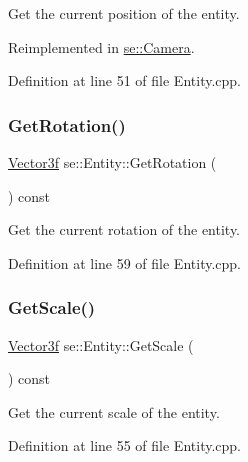 Get the current position of the entity. 

Reimplemented in \mbox{\hyperlink{classse_1_1_camera_af3d7f8a74dc26a3840331ab40b6ac893}{se\+::\+Camera}}.



Definition at line 51 of file Entity.\+cpp.

\mbox{\label{classse_1_1_entity_af509daf6cdb9bd75f2c503863c9a258c}} 
\subsubsection{\texorpdfstring{Get\+Rotation()}{GetRotation()}}
{\footnotesize\ttfamily \mbox{\hyperlink{namespacese_a12e07512d95e2fdebdaf74a5ea2cf5f6}{Vector3f}} se\+::\+Entity\+::\+Get\+Rotation (\begin{DoxyParamCaption}{ }\end{DoxyParamCaption}) const\hspace{0.3cm}{\ttfamily [virtual]}}

Get the current rotation of the entity. 

Definition at line 59 of file Entity.\+cpp.

\mbox{\label{classse_1_1_entity_abf885a240dc78562a82191fad6c9fc9b}} 
\subsubsection{\texorpdfstring{Get\+Scale()}{GetScale()}}
{\footnotesize\ttfamily \mbox{\hyperlink{namespacese_a12e07512d95e2fdebdaf74a5ea2cf5f6}{Vector3f}} se\+::\+Entity\+::\+Get\+Scale (\begin{DoxyParamCaption}{ }\end{DoxyParamCaption}) const\hspace{0.3cm}{\ttfamily [virtual]}}

Get the current scale of the entity. 

Definition at line 55 of file Entity.\+cpp.

\mbox{\label{classse_1_1_entity_a50066f09c64b3b9705b71366cc565527}} 
